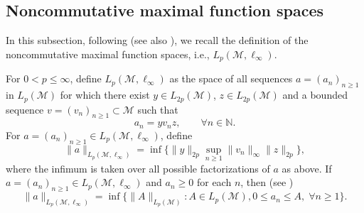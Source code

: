 \documentclass[11]{amsart}
\numberwithin{equation}{section}
\newcommand{\M}{\mathcal{M}}
\begin{document}
\subsection{Noncommutative maximal function spaces}\label{sec-maximalf}
In this subsection, following \cite{Ju2002, PIS7}   (see also \cite{HJP2016,CGP2020}), we recall the definition of the noncommutative maximal function spaces, i.e., $L_p(\mathcal M,\ell_{\infty})$.

For $0< p\leq \infty$, define $L_p(\mathcal{M},\ell_{\infty})$ as  the space of all sequences $a=(a_n)_{n\geq1}$ in $L_p(\mathcal{M})$ for which there exist $y\in L_{2p}(\mathcal{M})$, $z\in  L_{2p}(\mathcal{M})$ and a bounded sequence $v=(v_{n})_{n\geq1}\subset \M$ such that
$$a_n=yv_n z,\qquad \forall n\in \mathbb{N}.$$
For $a=(a_n)_{n\geq1}\in L_p(\mathcal{M},\ell_{\infty})$,  define
\begin{equation}\label{e-infty}
	\|a\|_{L_p(\mathcal M,\ell_{\infty})}=\inf\{\|y\|_{2p}\sup_{n\geq1}\|v_n\|_{\infty}\|z\|_{2p}\},
\end{equation}
where the infimum is taken over all possible factorizations of $a$ as above.
If $a=(a_n)_{n\geq1}\in L_{p}(\mathcal M,\ell_{\infty})$ and $a_n\geq0$ for each $n$, then (see \cite[p.\,392]{JX2007})
\begin{equation}\label{positive}
	\|a\|_{L_p(\mathcal{M},\ell_{\infty})}= \inf\{\|A\|_{L_p(\mathcal M)}:  A\in L_p(\mathcal{M}),  0\leq a_n\leq A,\;\forall n\geq1 \}.
\end{equation}
\end{document}
